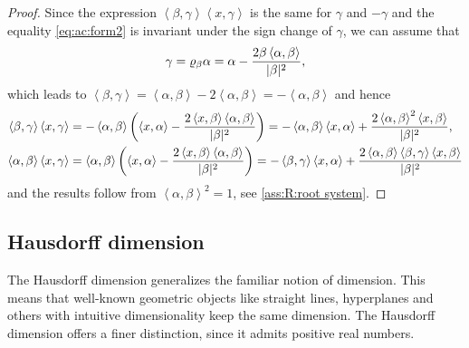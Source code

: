 \documentclass{article}
\numberwithin{equation}{section}
\newcommand{\xa}{\left<x,\alpha\right>}
\newcommand{\xb}{\left<x,\beta\right>}
\newcommand{\xc}{\left<x,\gamma\right>}
\newcommand{\ab}{\left<\alpha,\beta\right>}
\newcommand{\bc}{\left<\beta,\gamma\right>}
\newcommand{\reflect}[1]{\varrho_{#1}}
\theoremstyle{plain}
\begin{document}
\begin{proof}
   Since the expression $\bc\xc$ is the same for $\gamma$ and $-\gamma$ and the equality \ref{eq:ac:form2} is invariant under the sign change of $\gamma$, we can assume that 
	\begin{equation*}
	  \gamma = \reflect{\beta}\alpha= \alpha-\frac{2\beta\ab}{|\beta|^2}\/,
	\end{equation*}
	which leads to $\bc=\ab-2\ab=-\ab$ and hence
    \begin{align*}
        \bc\xc &= -\ab\left(\xa-\frac{2\xb\ab}{|\beta|^2}\right) = -\ab\xa + \frac{2\ab^2\xb}{|\beta|^2}\/,\\  
        \ab\xc &= \ab \left(\xa-\frac{2\xb\ab}{|\beta|^2}\right) = -\bc\xa + \frac{2\ab\bc\xb}{|\beta|^2}
    \end{align*}
     and the results follow from $\ab^2=1$, see \ref{ass:R:root system}.
\end{proof}



\subsection{Hausdorff dimension}
The Hausdorff dimension generalizes the familiar notion of dimension. This means that well-known geometric objects like straight lines, hyperplanes and others with intuitive dimensionality keep the same dimension. The Hausdorff dimension offers a finer distinction, since it admits positive real numbers. 
	
\end{document}
